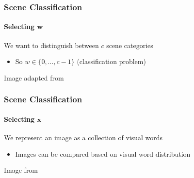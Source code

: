 \documentclass[xetex,professionalfont]{beamer}
\renewcommand{\vec}[1]{\ensuremath{\mathbf{#1}}}
\newcommand{\vw}{\vec{w}}
\newcommand{\vx}{\vec{x}}
\renewcommand\emph[1]{\textcolor{tuwcvl_inf_red}{#1}}
\begin{document}
\begin{frame}
\frametitle{Scene Classification}
\framesubtitle{Selecting $\vw$}

We want to distinguish between $c$ scene categories
\begin{itemize}
    \item So $w\in\{0,\dots,c-1\}$ (classification problem)
\end{itemize}

\medskip
\begin{center}
    {\centering Image adapted from \cite{prince12}}
\end{center}

\end{frame}


\begin{frame}
\frametitle{Scene Classification}
\framesubtitle{Selecting $\vx$}

We represent an image as a collection of \emph{visual words} %
\begin{itemize}
    \item Images can be compared based on visual word distribution
\end{itemize}

\medskip
\begin{center}
    {\centering Image from \cite{prince12}}
\end{center}

\end{frame}
\end{document}
